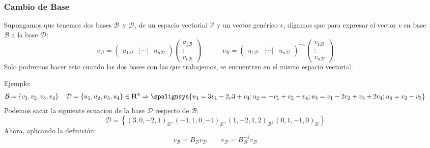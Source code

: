 \subsubsection{Cambio de Base}
Supongamos que tenemos dos bases \(\mathcal{B}\)\ y \(\mathcal{D}\), de un espacio vectorial \(\mathcal{V}\) y un vector genérico \(v\), digamos que para expresar el vector \(v\) en base \(\mathcal{B}\) a la base \(\mathcal{D}\):
\[
        \boxed{v_\mathcal{D} =
                \begin{pmatrix}
                        u_{1\mathcal{D}} & |\cdots| & u_{n\mathcal{D}}
                \end{pmatrix}
                \begin{pmatrix}
                        v_{1\mathcal{B}}
                        \\
                        \vdots
                        \\
                        v_{n\mathcal{B}}
                \end{pmatrix}}
        \hspace{3em}
        \boxed{v_\mathcal{B} =
        \begin{pmatrix}
                u_{1\mathcal{D}} & |\cdots | & u_{n\mathcal{D}}
        \end{pmatrix}^{-1}
        \begin{pmatrix}
                v_{1\mathcal{D}}
                \\
                \vdots
                \\
                v_{n\mathcal{D}}
        \end{pmatrix}}
\]
Solo podremos hacer esto cuando las dos bases con las que trabajemos, se encuentren en el mismo espacio vectorial.
\par Ejemplo:
\[
        \mathcal{B} = \left\{v_1, v_2, v_3, v_4\right\}  \hspace{1em} \mathcal{D} = \left\{u_1, u_2, u_3, u_4\right\} \in \mathbf{R}^4 \Rightarrow
        \spalignsys{
                u_1 = 3v_1 - 2_v3 + v_4;
                u_2 = -v_1 + v_2 - v_4;
                u_3 = v_1 - 2v_2 + v_3 + 2v_4;
                u_4 = v_2 - v_3
        }
\]
Podemos sacar la siguiente ecuacion de la base \(\mathcal{D}\) respecto de \(\mathcal{B}\):
\[
        \mathcal{D} = \left\{\left(3,0,-2,1\right)_\mathcal{B},
        \left(-1,1,0,-1\right)_\mathcal{B},
        \left(1,-2,1,2\right)_\mathcal{B},
        \left(0,1,-1,0\right)_\mathcal{B}
        \right\}
\]
Ahora, aplicando la definición:
\[
        v_\mathcal{B} = B_\mathcal{B} v_\mathcal{D} \hspace{2em} v_\mathcal{D} = B_\mathcal{B}^{-1} v_\mathcal{B}
\]
